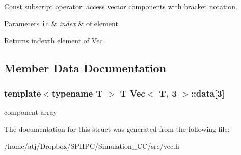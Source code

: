 Const subscript operator\+: access vector components with bracket notation. 


\begin{DoxyParams}[1]{Parameters}
\mbox{\tt in}  & {\em index} & of element \\
\hline
\end{DoxyParams}
\begin{DoxyReturn}{Returns}
index\textquotesingle{}th element of \hyperlink{structVec}{Vec} 
\end{DoxyReturn}


\subsection{Member Data Documentation}
\hypertarget{structVec_3_01T_00_013_01_4_a07af69736eca9e1115b69d51fac21514}{}
\subsubsection[{data}]{\setlength{\rightskip}{0pt plus 5cm}template$<$typename T $>$ T {\bf Vec}$<$ T, 3 $>$\+::data\mbox{[}3\mbox{]}}\label{structVec_3_01T_00_013_01_4_a07af69736eca9e1115b69d51fac21514}
component array 

The documentation for this struct was generated from the following file\+:\begin{DoxyCompactItemize}
\item 
/home/atj/\+Dropbox/\+S\+P\+H\+P\+C/\+Simulation\+\_\+\+C\+C/src/vec.\+h\end{DoxyCompactItemize}
